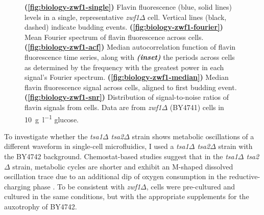 \begin{figure}
  \caption[
    Flavin fluorescence levels in a single, representative \textit{zwf1$\Delta$} cell.
    Mean Fourier spectrum of flavin fluorescence across cells.
    Median autocorrelation function of flavin fluorescence time series, along with the periods across cells.
    Median flavin fluorescence signal across cells, aligned to first budding event.
    Distribution of signal-to-noise ratios of flavin signals from cells.
    Data are from \textit{zwf1$\Delta$} (BY4741) cells in \SI{10}{\gram~\litre^{-1}} glucose.
  ]{
    \textbf{(\ref{fig:biology-zwf1-single})}
    Flavin fluorescence (blue, solid lines) levels in a single, representative \textit{zwf1$\Delta$} cell.
    Vertical lines (black, dashed) indicate budding events.
    \textbf{(\ref{fig:biology-zwf1-fourier})}
    Mean Fourier spectrum of flavin fluorescence across cells.
    \textbf{(\ref{fig:biology-zwf1-acf})}
    Median autocorrelation function of flavin fluorescence time series, along with \textit{\textbf{(inset)}} the periods across cells as determined by the frequency with the greatest power in each signal's Fourier spectrum.
    \textbf{(\ref{fig:biology-zwf1-median})}
    Median flavin fluorescence signal across cells, aligned to first budding event.
    \textbf{(\ref{fig:biology-zwf1-snr})}
    Distribution of signal-to-noise ratios of flavin signals from cells.
    Data are from \textit{zwf1$\Delta$} (BY4741) cells in \SI{10}{\gram~\litre^{-1}} glucose.
  }
  \label{fig:biology-zwf1}
\end{figure}

To investigate whether the \textit{tsa1$\Delta$ tsa2$\Delta$} strain shows metabolic oscillations of a different waveform in single-cell microfluidics, I used a \textit{tsa1$\Delta$ tsa2$\Delta$} strain with the BY4742 background.
Chemostat-based studies suggest that in the \textit{tsa1$\Delta$ tsa2$\Delta$} strain, metabolic cycles are shorter and exhibit an M-shaped dissolved oscillation trace due to an additional dip of oxygen consumption in the reductive-charging phase \parencite{caustonMetabolicCyclesYeast2015}.
To be consistent with \textit{zwf1$\Delta$}, cells were pre-cultured and cultured in the same conditions, but with the appropriate supplements for the auxotrophy of BY4742.
%

